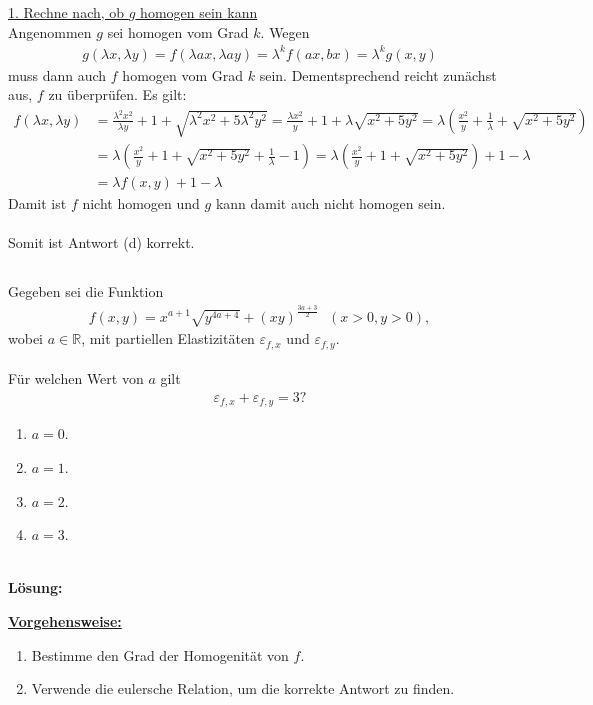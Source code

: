 \underline{1. Rechne nach, ob $ g $ homogen sein kann}\\
Angenommen $ g $ sei homogen vom Grad $ k $.
Wegen
\begin{align*}
g(\lambda x, \lambda y) 
= 
f(\lambda a x , \lambda a y)
=
\lambda^k f(ax, bx)
=
\lambda^k g(x,y)
\end{align*}
muss dann auch $ f $ homogen vom Grad $ k $ sein.
Dementsprechend reicht zunächst aus, $ f $ zu überprüfen.
Es gilt:
\begin{align*}
f(\lambda x, \lambda y)
&=
\frac{\lambda^2 x^2}{\lambda y} + 1 +
\sqrt{\lambda^2 x^2 + 5 \lambda^2 y^2}
=
\frac{\lambda x^2}{y} + 1 + \lambda \sqrt{x^2 + 5 y^2}
=
\lambda
\left( \frac{x^2}{y} + \frac{1}{\lambda} + \sqrt{x^2 + 5 y^2} \right)\\
&=
\lambda
\left( \frac{x^2}{y} + 1 + \sqrt{x^2 + 5 y^2} + \frac{1}{\lambda}  -1 \right)
=
\lambda \left( \frac{x^2}{y} + 1 + \sqrt{x^2 + 5 y^2}\right) + 1 - \lambda\\
&=
\lambda f(x,y) + 1 - \lambda
\end{align*}
Damit ist $ f $ nicht homogen und $ g $ kann damit auch nicht homogen sein.
\\
\\
Somit ist Antwort (d) korrekt. 
\newpage

\subsection*{}
Gegeben sei die Funktion
\begin{align*}
f(x,y) = 
x^{a+1} \sqrt{y^{4a + 4 }}+ ( xy)^{\frac{3a + 3}{2}} \ \ \ (x > 0, y > 0),
\end{align*}
wobei $ a \in \mathbb{R} $, mit partiellen Elastizitäten $ \varepsilon_{f,x} $ und $ \varepsilon_{f,y} $.\\
\\
Für welchen Wert von $ a $ gilt
\begin{align*}
\varepsilon_{f,x} + \varepsilon_{f,y} = 3?
\end{align*}
\renewcommand{\labelenumi}{(\alph{enumi})}
\begin{enumerate}
	\item 
	$a = 0$.
	\item
	$a = 1$.
	\item
	$a = 2$.
	\item
	$a = 3$.
\end{enumerate}
\
\\
\textbf{Lösung:}
\begin{mdframed}
\underline{\textbf{Vorgehensweise:}}
\renewcommand{\labelenumi}{\theenumi.}
\begin{enumerate}
\item Bestimme den Grad der Homogenität von $ f $.
\item Verwende die eulersche Relation, um die korrekte Antwort zu finden.
\end{enumerate}
\end{mdframed}


